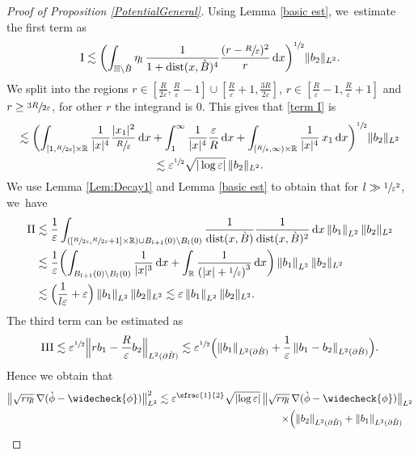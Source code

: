 \documentclass[10pt]{amsart}
\let\epsilon\varepsilon
\let\backslash\setminus
\newcommand{\rI}{\mathrm{I}}
\newcommand{\rII}{\mathrm{II}}
\newcommand{\rIII}{\mathrm{III}}
\theoremstyle{definition}
\DeclareMathOperator{\dist}{dist}
\newcommand\R{\mathbb{R}}
\newcommand\norm[1]{\left\lVert #1\right\rVert}
\newcommand\anorm[1]{\lVert #1\rVert}
\newcommand\bnorm[1]{\bigl\lVert #1\bigr\rVert}
\newcommand\Bnorm[1]{\Bigl\lVert #1\Bigr\rVert}
\newcommand\dd{\,\mathrm{d}}
\newcommand\dx{\dd x}
\let\chek\widecheck
\let\de\partial
\let\eps\epsilon
\begin{document}
\begin{proof}[Proof of Proposition \ref{PotentialGeneral}]
Using Lemma \ref{basic est}, we~estimate the first term as
\begin{align}\label{term I}
\rI\lesssim \biggl(\int_{\mathbb{H}\backslash\grave{B}}\eta_l\,\frac{1}{1+\dist(x,\grave{B})^4}\frac{(r-\sfrac{R}{\eps})^2}{r}\dx\biggr)^{\sfrac{1}{2}}\anorm{b_2}_{L^2}.
\end{align}
We split into the regions $ r\in [\frac{R}{2\eps},\frac{R}{\eps}-1]\cup [\frac{R}{\eps}+1,\frac{3R}{2\eps}]$, $r\in [ \frac{R}{\eps}-1,\frac{R}{\eps}+1]$ and $r\geq \sfrac{3R}{2\eps}$, for other $r$ the integrand is $0$. This gives that \eqref{term I} is
\begin{multline*}
\lesssim\biggl(\int_{[1,\sfrac{R}{2\eps}]\times\R}\frac{1}{|x|^4}\frac{|x_1|^2}{\sfrac{R}{\eps}}\dx+\int_{1}^\infty\frac{1}{|x|^4}{\frac{\eps}{R}}\dx+\int_{[\sfrac{R}{\eps},\infty)\times \R}\frac{1}{|x|^4}\,x_1\dx\biggr)^{\sfrac{1}{2}}\anorm{b_2}_{L^2}\\
\lesssim \eps^{\sfrac{1}{2}}\sqrt{|\log \eps|}\,\anorm{b_2}_{L^2}.
\end{multline*}
We use Lemma \ref{Lem:Decay1} and Lemma \ref{basic est} to obtain that for $l\gg\sfrac{1}{\eps^2}$, we~have
\begin{align*}
\rII&\lesssim \frac{1}{\eps}\int_{\left([\sfrac{R}{2\eps},\sfrac{R}{2\eps}+1]\times \R\right)\cup B_{l+1}(0)\backslash B_l(0)}\frac{1}{\dist(x,\grave{B})}\frac{1}{\dist(x,\grave{B})^2}\dx\norm{b_1}_{L^2}\anorm{b_2}_{L^2}\\
&\lesssim \frac{1}{\eps}\biggl(\int_{B_{l+1}(0)\backslash B_l(0)}\frac{1}{|x|^3}\dx+\int_\R\frac{1}{\left(|x|+\sfrac{1}{\eps}\right)^3}\dx\biggr)\norm{b_1}_{L^2}\anorm{b_2}_{L^2}\\
&\lesssim \Bigl(\frac{1}{l\eps}+\eps\Bigr)\norm{b_1}_{L^2}\anorm{b_2}_{L^2}\lesssim \eps\norm{b_1}_{L^2}\anorm{b_2}_{L^2}.
\end{align*}
The third term can be estimated as
\begin{align*}
\rIII\lesssim \eps^{\sfrac{1}{2}}\Bnorm{rb_1-\frac{R}{\eps}b_2}_{L^2(\de \grave{B})}\lesssim \eps^{\sfrac12}\Bigl(\norm{b_1}_{L^2(\de\grave{B})}+\frac{1}{\eps}\norm{b_1-b_2}_{L^2(\de\grave{B})}\Bigr).
\end{align*}
Hence we obtain that
\begin{multline*}
\bnorm{\sqrt{r\eta_l}\,\nabla(\grave{\phi}-\chek{\phi})}_{L^2}^2\lesssim \eps^{\sfrac{1}{2}}\sqrt{|{\log\eps}|}\,\bnorm{\sqrt{r\eta_l}\,\nabla(\grave{\phi}-\chek{\phi})}_{L^2}\\
\shoveright{\times\Bigl(\anorm{b_2}_{L^2(\de\grave{B})}+\norm{b_1}_{L^2(\de\grave{B})}
}
\end{multline*}
\end{proof}
\end{document}
